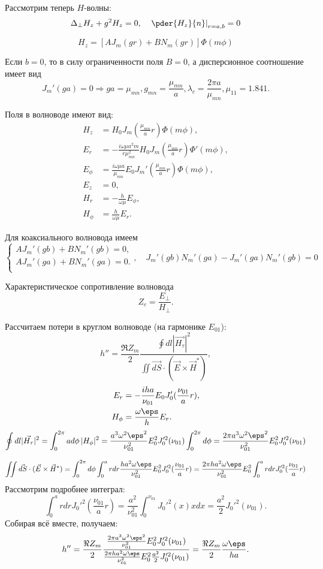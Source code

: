 Рассмотрим теперь \( H \)-волны:
\[
	\Delta_\perp H_z + g^2H_z = 0,\quad \left.\pder{H_z}{n}\right|_{r=a,b}= 0
\]

\[
	H_z = [AJ_m(gr) + BN_m(gr)]\Phi(m\phi)
\]

Если \( b=0 \), то в силу ограниченности поля \(B = 0\), а дисперсионное соотношение имеет вид
\[
	J_m'(ga) = 0 \Rightarrow ga = \mu_{mn}, g_{mn} = \frac{\mu_{mn}}{a}, \lambda_c = \frac{2\pi a}{\mu_{mn}}, \mu_{11} = 1.841.
\]

Поля в волноводе имеют вид:
\begin{align*}
	H_z &= H_0 J_m(\frac{\mu_{mn}}{a}r)\Phi(m\phi),\\
	E_r &= -\frac{i\omega\mu a^2m}{r\mu_{mn}^2}H_0 J_m(\frac{\mu_{mn}}{a}r)\Phi'(m\phi),\\
	E_\phi &= \frac{i\omega\mu a}{\mu_{mn}}E_0 J_m'(\frac{\mu_{mn}}{a}r)\Phi(m\phi),\\
	E_z &= 0,\\
	H_r &= -\frac{h}{\omega\mu}E_\phi,\\
	H_\phi &= \frac{h}{\omega\mu}E_r.
\end{align*}

Для коаксиального волновода имеем
\[
	\begin{cases}
		AJ_m'(gb) + BN_m'(gb) = 0,\\
		AJ_m'(ga) + BN_m'(ga) = 0.\\
	\end{cases},
	\quad
	J_m'(gb)N_m'(ga) - J_m'(ga)N_m'(gb) = 0
\]

Характеристическое сопротивление волновода
\[
	Z_c = \frac{E_\perp}{H_\perp}.
\]

Рассчитаем потери в круглом волноводе (на гармонике \(E_{01}\)):
\[
	h'' = \frac{\Re Z_m}{2}\frac{\oint dl |\vec{H_\tau}|^2}{\iint \vec{dS}\cdot(\vec{E}\times\vec{H}^*)},
\]
\begin{align*}
	E_r &= -\frac{iha}{\nu_{01}}E_0 J_0'(\frac{\nu_{01}}{a}r),\\
	H_\phi &= \frac{\omega\eps}{h}E_r.
\end{align*}
\[
	\oint dl |\vec{H_\tau}|^2 = \int_0^{2\pi} a d\phi\,|H_\phi|^2 =
	\frac{a^3\omega^2\eps^2}{\nu_{01}^2}E_0^2J_0'^2(\nu_{01})\int_0^{2\pi} d\phi = \frac{2\pi a^3\omega^2\eps^2}{\nu_{01}^2}E_0^2J_0'^2(\nu_{01})
\]

\[
	\iint \vec{dS}\cdot(\vec{E}\times\vec{H}^*) = \int_0^{2\pi}d\phi\int_0^a rdr \frac{ha^2\omega\eps}{\nu_{01}^2}E_0^2J_0'^2(\frac{\nu_{01}}{a}r)= \frac{2\pi ha^2\omega\eps}{\nu_{01}^2}E_0^2 \int_0^a rdrJ_0'^2(\frac{\nu_{01}}{a}r)
\]
Рассмотрим подробнее интеграл:
\[
	\int_0^a rdr J_0'^2(\frac{\nu_{01}}{a}r) =
	\frac{a^2}{\nu_{01}^2}\int_0^{\nu_{01}} J_0'^2(x) x dx =
	\frac{a^2}{2}J_0'^2(\nu_{01}).
\]
Собирая всё вместе, получаем:
\[
	h'' = \frac{\Re Z_m}{2}\frac{\frac{2\pi a^3\omega^2\eps^2}{\nu_{01}^2}E_0^2J_0'^2(\nu_{01})}{\frac{2\pi ha^2\omega\eps}{\nu_{01}^2}E_0^2\frac{a^2}{2}J_0'^2(\nu_{01})} = \frac{\Re Z_m}{2}\frac{\omega\eps}{ha}.
\]

